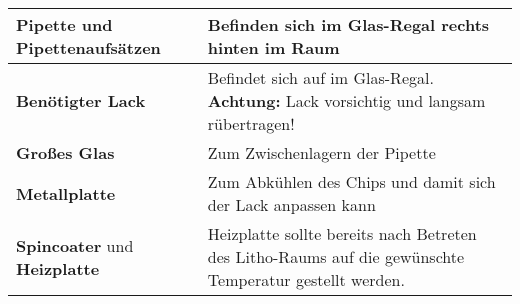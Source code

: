 \documentclass[12pt,a4paper]{article}
\begin{document}
\begin{tabular}{| p{5cm} | p{10cm} |} \hline
\textbf{Pipette und Pipettenaufsätzen} & Befinden sich im Glas-Regal rechts hinten im Raum\\ \hline
\textbf{Benötigter Lack} & Befindet sich auf im Glas-Regal.\newline
\textbf{Achtung:} Lack vorsichtig und langsam rübertragen!\\ \hline
\textbf{Großes Glas} & Zum Zwischenlagern der Pipette\\ \hline
\textbf{Metallplatte} & Zum Abkühlen des Chips und damit sich der Lack anpassen kann\\ \hline
\textbf{Spincoater} und \textbf{Heizplatte} & Heizplatte sollte bereits nach Betreten des Litho-Raums auf die gewünschte Temperatur gestellt werden.\\ \hline

\end{tabular}

\bigskip
\end{document}

